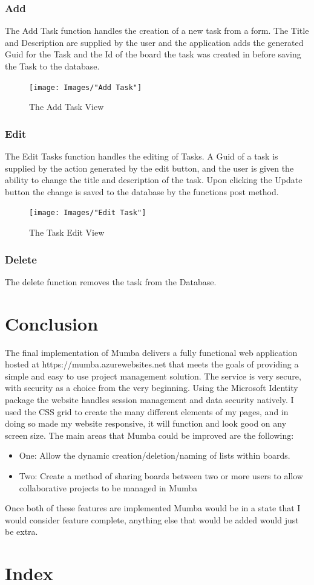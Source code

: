 \documentclass[letterpaper]{article}
\begin{document}
\subsubsection{Add}
The Add Task function handles the creation of a new task from a form. The Title and Description are supplied by the user and the application adds the generated Guid for the Task and the Id of the board the task was created in before saving the Task to the database.
\begin{figure}[H]
  \centering
  \caption{The Add Task View}
  \texttt{[image: Images/"Add Task"]}
\end{figure}

\subsubsection{Edit}

The Edit Tasks function handles the editing of Tasks. A Guid of a task is supplied by the action generated by the edit button, and the user is given the ability to change the title and description of the task. Upon clicking the Update button the change is saved to the database by the functions post method.

\begin{figure}[H]
  \centering
  \caption{The Task Edit View}
  \texttt{[image: Images/"Edit Task"]}
\end{figure}


\subsubsection{Delete}
The delete function removes the task from the Database.

\pagebreak
\section{Conclusion}
The final implementation of Mumba delivers a fully functional web application hosted at https://mumba.azurewebsites.net that meets the goals of providing a simple and easy to use project management solution. The service is very secure, with security as a choice from the very beginning. Using the Microsoft Identity package the website handles session management and data security natively. I used the CSS grid to create the many different elements of my pages, and in doing so made my website responsive, it will function and look good on any screen size. The main areas that Mumba could be improved are the following:
\begin{itemize}
  \item One: Allow the dynamic creation/deletion/naming of lists within boards.
  \item Two: Create a method of sharing boards between two or more users to allow collaborative projects to be managed in Mumba
\end{itemize}
Once both of these features are implemented Mumba would be in a state that I would consider feature complete, anything else that would be added would just be extra.
\pagebreak
\section{Index}
\listoffigures
\end{document}
